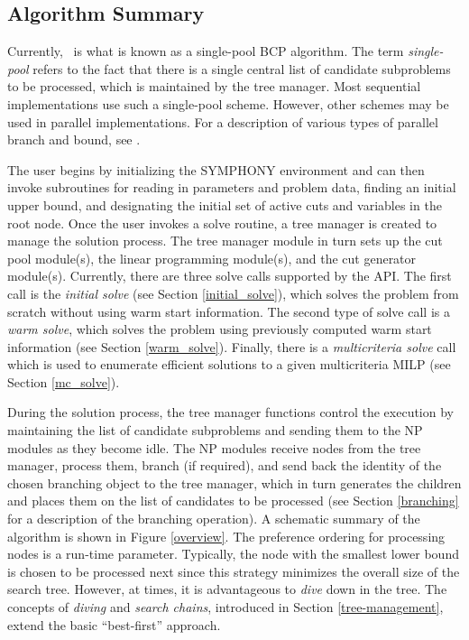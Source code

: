 \subsection{Algorithm Summary}
\label{symphony}

Currently, \BB\ is what is known as a single-pool BCP algorithm.
The term {\em single-pool} refers to the fact that there is a single
central list of candidate subproblems to be processed, which is
maintained by the tree manager. Most sequential implementations use
such a single-pool scheme. However, other schemes may be used in
parallel implementations. For a description of various types of
parallel branch and bound, see \cite{gend:paral}.

The user begins by initializing the SYMPHONY environment and can then invoke
subroutines for reading in parameters and problem data, finding an initial
upper bound, and designating the initial set of active cuts and variables in
the root node. Once the user invokes a solve routine, a tree manager is
created to manage the solution process. The tree manager module in turn sets
up the cut pool module(s), the linear programming module(s), and the cut
generator module(s). Currently, there are three solve calls supported by the
API. The first call is the \emph{initial solve} (see Section
\ref{initial_solve}), which solves the problem from scratch without using warm
start information. The second type of solve call is a \emph{warm solve}, which
solves the problem using previously computed warm start information (see
Section \ref{warm_solve}). Finally, there is a \emph{multicriteria solve} call
which is used to enumerate efficient solutions to a given multicriteria MILP
(see Section \ref{mc_solve}).

During the solution process, the tree manager functions control the execution
by maintaining the list of candidate subproblems and sending them to the NP
modules as they become idle. The NP modules receive nodes from the tree
manager, process them, branch (if required), and send back the identity of the
chosen branching object to the tree manager, which in turn generates the
children and places them on the list of candidates to be processed (see
Section \ref{branching} for a description of the branching operation). A
schematic summary of the algorithm is shown in Figure \ref{overview}. The
preference ordering for processing nodes is a run-time parameter. Typically,
the node with the smallest lower bound is chosen to be processed next since
this strategy minimizes the overall size of the search tree. However, at
times, it is advantageous to {\em dive} down in the tree. The concepts of {\em
diving} and {\em search chains}, introduced in Section \ref{tree-management},
extend the basic ``best-first'' approach.

